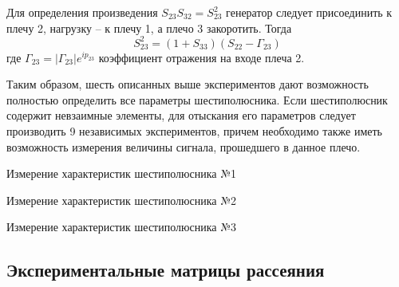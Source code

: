 Для определения произведения $S_{23}S_{32}=S_{23}^2$ генератор следует
присоединить к плечу 2, нагрузку -- к плечу 1, а плечо 3 закоротить.
Тогда
\begin{equation}
	S _ { 23 } ^ { 2 } = \left( 1 + S _ { 33 } \right) \left( S _ { 22 } - \Gamma _ { 23 } \right)
\end{equation}
где $\Gamma _ { 23 } = \left| \Gamma _ { 23 } \right| e ^ { i p _ { 23 } }$ коэффициент отражения на входе плеча 2.

Таким образом, шесть описанных выше экспериментов дают возможность полностью определить все параметры  шестиполюсника.
Если шестиполюсник содержит невзаимные элементы, для отыскания его параметров следует производить 9 независимых экспериментов, причем необходимо также иметь возможность измерения величины сигнала, прошедшего в данное плечо.


\begin{table}[h!]
	\caption{Измерение характеристик шестиполюсника №1}
	\label{tab:1}
	\vspace{1em}
	\centering
	
\end{table}


\begin{table}[h!]
	\caption{Измерение характеристик шестиполюсника №2}
	\label{tab:2}
	\vspace{1em}
	\centering
	
\end{table}


\begin{table}[h!]
	\caption{Измерение характеристик шестиполюсника №3}
	\label{tab:3}
	\vspace{1em}
	\centering
	
\end{table}

\subsection{Экспериментальные матрицы рассеяния}

